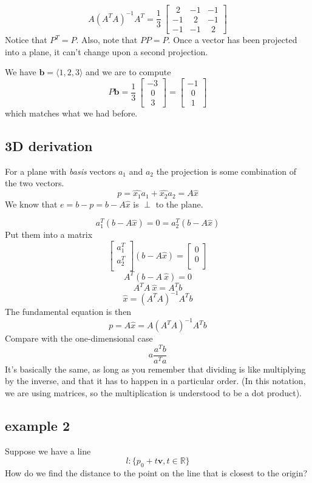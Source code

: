 \documentclass[11pt, oneside]{article}   	%
\begin{document}
\[ A (A^T A)^{-1} A^T = 
\frac{1}{3} \
\begin{bmatrix}
\ \ 2 & -1 & -1 \\
-1 & \ \ 2 & -1 \\
-1 & -1 & \ \ 2
\end{bmatrix}
\]
Notice that $P^T = P$.  Also, note that $PP = P$.  Once a vector has been projected into a plane, it can't change upon a second projection.

We have $\mathbf{b} = \langle 1, 2, 3 \rangle$ and we are to compute
\[ P \mathbf{b} =  
\frac{1}{3} \
\begin{bmatrix}
-3 \\
\ \ 0 \\
\ \ 3
\end{bmatrix}
=
\begin{bmatrix}
-1 \\
\ \ 0 \\
\ \ 1
\end{bmatrix}
 \]
which matches what we had before.

\subsection*{3D derivation}
For a plane with \emph{basis} vectors $a_1$ and $a_2$ the projection is some combination of the two vectors.
\[ p = \hat{x_1} a_1 + \hat{x_2} a_2 = A \hat{x} \]
We know that $e=b-p=b-A\hat{x}$ is $\perp$ to the plane.

\[ a_1^T(b-A \hat{x}) = 0 =  a_2^T(b-A \hat{x}) \]
Put them into a matrix
\[  
\begin{bmatrix} 
  a_1^T    \\ 
  a_2^T    \\
\end{bmatrix}
(b-A\hat{x}) =
\begin{bmatrix} 
  0    \\ 
  0    \\
\end{bmatrix}
\]
\[A^T(b-A\ \hat{x}) = 0 \]
\[A^T A\ \hat{x} = A^Tb \]
\[ \hat{x} = (A^T A)^{-1}A^Tb \]
The fundamental equation is then
\[ p = A \hat{x} = A(A^T A)^{-1}A^Tb \]
Compare with the one-dimensional case
\[ a\frac{a^T b}{a^Ta} \]
It's basically the same, as long as you remember that dividing is like multiplying by the inverse, and that it has to happen in a particular order.  (In this notation, we are using matrices, so the multiplication is understood to be a dot product).

\subsection*{example 2}
Suppose we have a line
\[ l : \{p_0 + t \mathbf{v}, t \in \mathbb{R} \} \]
How do we find the distance to the point on the line that is closest to the origin?  
\end{document}
